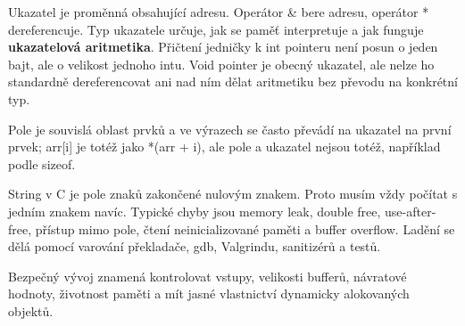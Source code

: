 Ukazatel je proměnná obsahující adresu. Operátor \& bere adresu, operátor * dereferencuje. Typ ukazatele určuje, jak se paměť interpretuje a jak funguje \textbf{ukazatelová aritmetika}. Přičtení jedničky k int pointeru není posun o jeden bajt, ale o velikost jednoho intu. Void pointer je obecný ukazatel, ale nelze ho standardně dereferencovat ani nad ním dělat aritmetiku bez převodu na konkrétní typ.

Pole je souvislá oblast prvků a ve výrazech se často převádí na ukazatel na první prvek; arr[i] je totéž jako *(arr + i), ale pole a ukazatel nejsou totéž, například podle sizeof.

String v C je pole znaků zakončené nulovým znakem. Proto musím vždy počítat s jedním znakem navíc. Typické chyby jsou memory leak, double free, use-after-free, přístup mimo pole, čtení neinicializované paměti a buffer overflow. Ladění se dělá pomocí varování překladače, gdb, Valgrindu, sanitizérů a testů.

Bezpečný vývoj znamená kontrolovat vstupy, velikosti bufferů, návratové hodnoty, životnost paměti a mít jasné vlastnictví dynamicky alokovaných objektů.


\newpage

